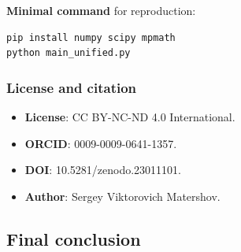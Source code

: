 \documentclass[11pt,a4paper]{article}
\theoremstyle{definition}
\begin{document}
\medskip\noindent
\textbf{Minimal command} for reproduction:
\begin{verbatim}
pip install numpy scipy mpmath
python main_unified.py
\end{verbatim}

\subsubsection{License and citation}

\begin{itemize}
    \item \textbf{License}: CC BY-NC-ND 4.0 International.
    \item \textbf{ORCID}: 0009-0009-0641-1357.
    \item \textbf{DOI}: 10.5281/zenodo.23011101.
    \item \textbf{Author}: Sergey Viktorovich Matershov.
\end{itemize}

\subsection{Final conclusion}
\label{subsec:conclusions-final}
\end{document}
